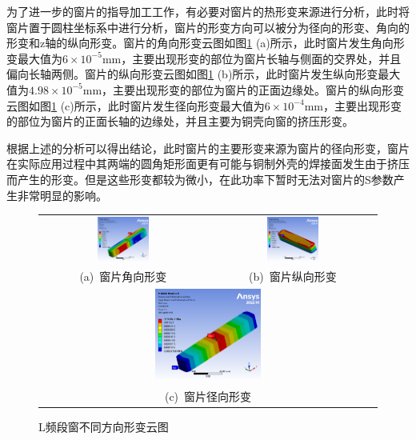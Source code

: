 \documentclass[master]{thesis-uestc}
\begin{document}
为了进一步的窗片的指导加工工作，有必要对窗片的热形变来源进行分析，此时将窗片置于圆柱坐标系中进行分析，窗片的形变方向可以被分为径向的形变、角向的形变和z轴的纵向形变。窗片的角向形变云图如图\ref{fig:L频段窗不同方向形变} (a)所示，此时窗片发生角向形变最大值为\(6 \times 10^{-5}\)mm，主要出现形变的部位为窗片长轴与侧面的交界处，并且偏向长轴两侧。窗片的纵向形变云图如图\ref{fig:L频段窗不同方向形变} (b)所示，此时窗片发生纵向形变最大值为\(4.98 \times 10^{-5}\)mm，主要出现形变的部位为窗片的正面边缘处。窗片的纵向形变云图如图\ref{fig:L频段窗不同方向形变} (c)所示，此时窗片发生径向形变最大值为\(6 \times 10^{-4}\)mm，主要出现形变的部位为窗片的正面长轴的边缘处，并且主要为铜壳向窗的挤压形变。

根据上述的分析可以得出结论，此时窗片的主要形变来源为窗片的径向形变，窗片在实际应用过程中其两端的圆角矩形面更有可能与铜制外壳的焊接面发生由于挤压而产生的形变。但是这些形变都较为微小，在此功率下暂时无法对窗片的S参数产生非常明显的影响。
\begin{figure}[!htbp]
    \small
    \centering
    \begin{tabular}{@{\ }c@{\ }c}
        \includegraphics[width=0.32\textwidth]{pic/chapter4/L角向形变.png} & 
        \hspace{5pt}
        \includegraphics[width=0.32\textwidth]{pic/chapter4/L纵向形变.png}     \\
        \mbox{\small (a) 窗片角向形变}                                                                               & 
        \mbox{\small (b) 窗片纵向形变}                                                                                  \\[6bp]
        \multicolumn{2}{c}{\includegraphics[width=0.32\textwidth]{pic/chapter4/L径向形变.png}} \\  %
        \multicolumn{2}{c}{\mbox{\small (c) 窗片径向形变}}
    \end{tabular}
    \caption{L频段窗不同方向形变云图}
    \label{fig:L频段窗不同方向形变}
\end{figure}
\end{document}
